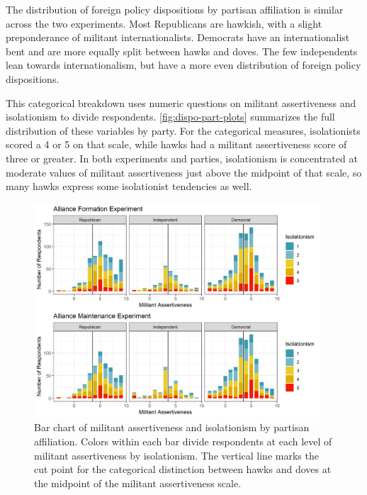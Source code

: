 \documentclass[12pt]{article}
\begin{document}
The distribution of foreign policy dispositions by partisan affiliation is similar across the two experiments. 
Most Republicans are hawkish, with a slight preponderance of militant internationalists. 
Democrats have an internationalist bent and are more equally split between hawks and doves. 
The few independents lean towards internationalism, but have a more even distribution of foreign policy dispositions. 


This categorical breakdown uses numeric questions on militant assertiveness and isolationism to divide respondents. 
\autoref{fig:dispo-part-plots} summarizes the full distribution of these variables by party. 
For the categorical measures, isolationists scored a 4 or 5 on that scale, while hawks had a militant assertiveness score of three or greater. 
In both experiments and parties, isolationism is concentrated at moderate values of militant assertiveness just above the midpoint of that scale, so many hawks express some isolationist tendencies as well.    


\begin{figure}
	\centering
		\includegraphics[width=0.95\textwidth]{dispo-part-plots.png}
	\caption{Bar chart of militant assertiveness and isolationism by partisan affiliation. Colors within each bar divide respondents at each level of militant assertiveness by isolationism. The vertical line marks the cut point for the categorical distinction between hawks and doves at the midpoint of the militant assertiveness scale.}
	\label{fig:dispo-part-plots}
\end{figure}



\newpage
\end{document}
